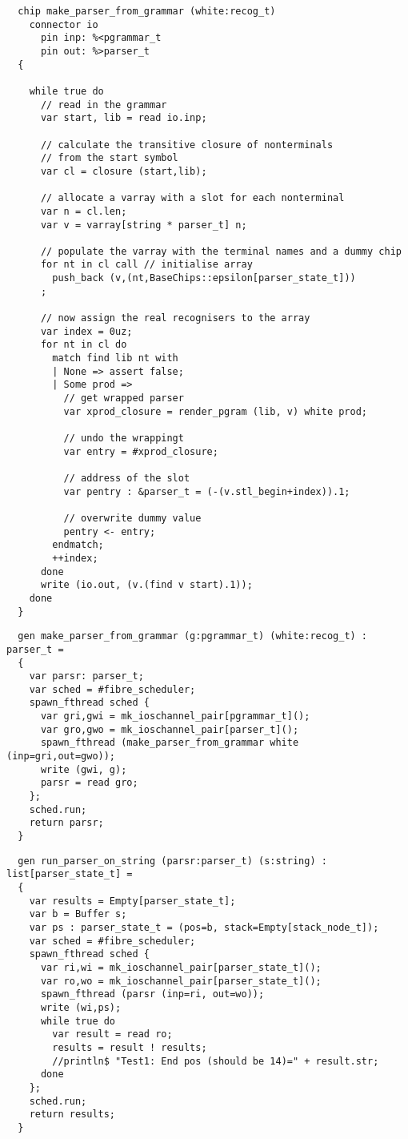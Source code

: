 \documentclass[oneside]{book}
\begin{document}
\begin{verbatim}
  chip make_parser_from_grammar (white:recog_t)
    connector io
      pin inp: %<pgrammar_t
      pin out: %>parser_t
  {

    while true do
      // read in the grammar
      var start, lib = read io.inp;

      // calculate the transitive closure of nonterminals
      // from the start symbol
      var cl = closure (start,lib);

      // allocate a varray with a slot for each nonterminal
      var n = cl.len;
      var v = varray[string * parser_t] n;

      // populate the varray with the terminal names and a dummy chip
      for nt in cl call // initialise array
        push_back (v,(nt,BaseChips::epsilon[parser_state_t]))
      ;

      // now assign the real recognisers to the array
      var index = 0uz;
      for nt in cl do
        match find lib nt with
        | None => assert false;
        | Some prod =>
          // get wrapped parser 
          var xprod_closure = render_pgram (lib, v) white prod;

          // undo the wrappingt
          var entry = #xprod_closure;

          // address of the slot
          var pentry : &parser_t = (-(v.stl_begin+index)).1;

          // overwrite dummy value
          pentry <- entry;
        endmatch;
        ++index;
      done
      write (io.out, (v.(find v start).1));
    done
  }
\end{verbatim}

\begin{verbatim}
  gen make_parser_from_grammar (g:pgrammar_t) (white:recog_t) : parser_t =
  {
    var parsr: parser_t;
    var sched = #fibre_scheduler; 
    spawn_fthread sched {
      var gri,gwi = mk_ioschannel_pair[pgrammar_t]();
      var gro,gwo = mk_ioschannel_pair[parser_t]();
      spawn_fthread (make_parser_from_grammar white (inp=gri,out=gwo));
      write (gwi, g);
      parsr = read gro;
    };
    sched.run;
    return parsr;
  }
\end{verbatim}

\begin{verbatim}
  gen run_parser_on_string (parsr:parser_t) (s:string) : list[parser_state_t] =
  {
    var results = Empty[parser_state_t]; 
    var b = Buffer s;
    var ps : parser_state_t = (pos=b, stack=Empty[stack_node_t]);
    var sched = #fibre_scheduler; 
    spawn_fthread sched { 
      var ri,wi = mk_ioschannel_pair[parser_state_t]();
      var ro,wo = mk_ioschannel_pair[parser_state_t]();
      spawn_fthread (parsr (inp=ri, out=wo));
      write (wi,ps);
      while true do
        var result = read ro;
        results = result ! results;
        //println$ "Test1: End pos (should be 14)=" + result.str;
      done
    };
    sched.run;
    return results;
  }
\end{verbatim}
\end{document}
